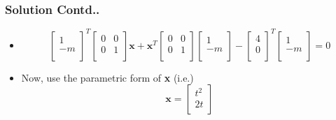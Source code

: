 \documentclass[12pt]{beamer}
\begin{document}
\begin{frame}
\frametitle{Solution Contd..}
\begin{itemize}
\item<1-2>
\[
\begin{bmatrix}
    1\\
    -m\\  
\end{bmatrix}^T
\begin{bmatrix}
    0 & 0\\
    0 & 1\\  
\end{bmatrix}
\textbf{x} + 
\textbf{x}^T
\begin{bmatrix}
    0 & 0\\
    0 & 1\\  
\end{bmatrix}
\begin{bmatrix}
    1\\
    -m\\  
\end{bmatrix} - 
\begin{bmatrix}
    4\\
    0\\  
\end{bmatrix}^T
\begin{bmatrix}
    1\\
    -m\\  
\end{bmatrix} = 0
\]
\item<2> Now, use the parametric form of \textbf{x} (i.e.)
\[
\textbf{x} = 
\begin{bmatrix}
    t^2\\
    2t\\  
\end{bmatrix}
\]
\end{itemize}
\end{frame}


\end{document}
